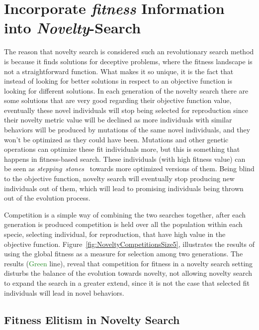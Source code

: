 \section{Incorporate \emph{fitness} Information into \emph{Novelty}-Search}

The reason that novelty search is considered such an revolutionary search method is because it finds solutions for deceptive problems, where the fitness landscape is not a straightforward function. What makes it so unique, it is the fact that instead of looking for better solutions in respect to an objective function is looking for different solutions. In each generation of the novelty search there are some solutions that are very good regarding their objective function value, eventually these novel individuals will stop being selected for reproduction since their novelty metric value will be declined as more individuals with similar behaviors will be produced by mutations of the same novel individuals, and they won't be optimized as they could have been. Mutations and other genetic operations can optimize these fit individuals more, but this is something that happens in fitness-based search. These individuals (with high fitness value) can be seen as \emph{stepping~stones}~\cite{lehman2011abandoning} towards more optimized versions of them. Being blind to the objective function, novelty search will eventually stop producing new individuals out of them, which will lead to promising individuals being thrown out of the evolution process. 

Competition is a simple way of combining the two searches together, after each generation is produced competition is held over all the population within each specie, selecting individual, for reproduction, that have high value in the objective function. Figure~\ref{fig:NoveltyCompetitionsSize5}, illustrates the results of using the global fitness as a measure for selection among two generations. The results (\textcolor{ForestGreen}{Green} line), reveal that competition for fitness in a novelty search setting disturbs the balance of the evolution towards novelty, not allowing novelty search to expand the search in a greater extend, since it is not the case that selected fit individuals will lead in novel behaviors. 






\subsection*{Fitness Elitism in Novelty Search}

